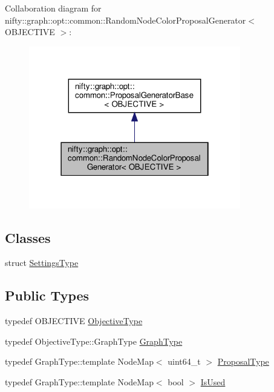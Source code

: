 Collaboration diagram for nifty\+:\+:graph\+:\+:opt\+:\+:common\+:\+:Random\+Node\+Color\+Proposal\+Generator$<$ O\+B\+J\+E\+C\+T\+I\+VE $>$\+:
\nopagebreak
\begin{figure}[H]
\begin{center}
\leavevmode
\includegraphics[width=262pt]{classnifty_1_1graph_1_1opt_1_1common_1_1RandomNodeColorProposalGenerator__coll__graph}
\end{center}
\end{figure}
\subsection*{Classes}
\begin{DoxyCompactItemize}
\item 
struct \hyperlink{structnifty_1_1graph_1_1opt_1_1common_1_1RandomNodeColorProposalGenerator_1_1SettingsType}{Settings\+Type}
\end{DoxyCompactItemize}
\subsection*{Public Types}
\begin{DoxyCompactItemize}
\item 
typedef O\+B\+J\+E\+C\+T\+I\+VE \hyperlink{classnifty_1_1graph_1_1opt_1_1common_1_1RandomNodeColorProposalGenerator_ac9a200d0d544cbe279eb5cfb4d51d3d5}{Objective\+Type}
\item 
typedef Objective\+Type\+::\+Graph\+Type \hyperlink{classnifty_1_1graph_1_1opt_1_1common_1_1RandomNodeColorProposalGenerator_a39d7fdcca43df0ce3e53a415391670b6}{Graph\+Type}
\item 
typedef Graph\+Type\+::template Node\+Map$<$ uint64\+\_\+t $>$ \hyperlink{classnifty_1_1graph_1_1opt_1_1common_1_1RandomNodeColorProposalGenerator_aac7752a102f9b23fd2b21ee80e18ce98}{Proposal\+Type}
\item 
typedef Graph\+Type\+::template Node\+Map$<$ bool $>$ \hyperlink{classnifty_1_1graph_1_1opt_1_1common_1_1RandomNodeColorProposalGenerator_a252ead89e3354056605c75b9da12de53}{Is\+Used}
\end{DoxyCompactItemize}
